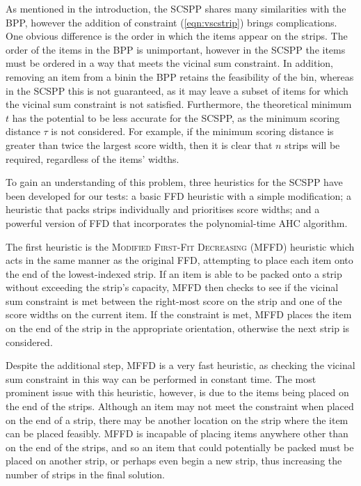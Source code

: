 \documentclass[runningheads]{llncs}
\begin{document}
As mentioned in the introduction, the SCSPP shares many similarities with the BPP, however the addition of constraint (\ref{eqn:vscstrip}) brings complications. One obvious difference is the order in which the items appear on the strips. The order of the items in the BPP is unimportant, however in the SCSPP the items must be ordered in a way that meets the vicinal sum constraint. In addition, removing an item from a binin the BPP retains the feasibility of the bin, whereas in the SCSPP this is not guaranteed, as it may leave a subset of items for which the vicinal sum constraint is not satisfied. Furthermore, the theoretical minimum $t$ has the potential to be less accurate for the SCSPP, as the minimum scoring distance $\tau$ is not considered. For example, if the minimum scoring distance is greater than twice the largest score width, then it is clear that $n$ strips will be required, regardless of the items' widths.

To gain an understanding of this problem, three heuristics for the SCSPP have been developed for our tests: a basic FFD heuristic with a simple modification; a heuristic that packs strips individually and prioritises score widths; and a powerful version of FFD that incorporates the polynomial-time AHC algorithm.

The first heuristic is the \textsc{Modified First-Fit Decreasing} (MFFD) heuristic which acts in the same manner as the original FFD, attempting to place each item onto the end of the lowest-indexed strip. If an item is able to be packed onto a strip without exceeding the strip's capacity, MFFD then checks to see if the vicinal sum constraint is met between the right-most score on the strip and one of the score widths on the current item. If the constraint is met, MFFD places the item on the end of the strip in the appropriate orientation, otherwise the next strip is considered. 

Despite the additional step, MFFD is a very fast heuristic, as checking the vicinal sum constraint in this way can be performed in constant time. The most prominent issue with this heuristic, however, is due to the items being placed on the end of the strips. Although an item may not meet the constraint when placed on the end of a strip, there may be another location on the strip where the item can be placed feasibly. MFFD is incapable of placing items anywhere other than on the end of the strips, and so an item that could potentially be packed must be placed on another strip, or perhaps even begin a new strip, thus increasing the number of strips in the final solution.
\end{document}
